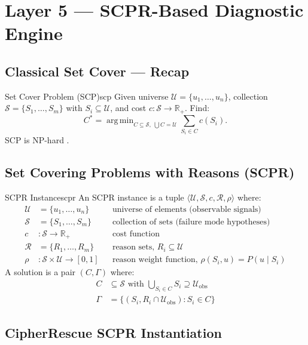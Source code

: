 \documentclass[11pt,a4paper]{report}
\DeclareMathOperator*{\argmin}{arg\,min}
\newcommand{\calU}{\mathcal{U}}
\newcommand{\calS}{\mathcal{S}}
\newcommand{\calR}{\mathcal{R}}
\begin{document}
\chapter{Layer 5 --- SCPR-Based Diagnostic Engine}

\section{Classical Set Cover --- Recap}

\begin{definition}{Set Cover Problem (SCP)}{scp}
Given universe $\calU = \{u_1,\ldots,u_n\}$, collection $\calS = \{S_1,\ldots,S_m\}$ with $S_i \subseteq \calU$, and cost $c : \calS \to \mathbb{R}_+$. Find:
\[
  C^* = \argmin_{C \subseteq \calS,\; \bigcup C = \calU} \sum_{S_i \in C} c(S_i).
\]
SCP is NP-hard \citep{karp1972}.
\end{definition}

\section{Set Covering Problems with Reasons (SCPR)}\label{sec:scpr}

\begin{definition}{SCPR Instance}{scpr}
An SCPR instance is a tuple $\langle \calU, \calS, c, \calR, \rho \rangle$ where:
\begin{align*}
  \calU &= \{u_1,\ldots,u_n\} && \text{universe of elements (observable signals)} \\
  \calS &= \{S_1,\ldots,S_m\} && \text{collection of sets (failure mode hypotheses)} \\
  c &: \calS \to \mathbb{R}_+ && \text{cost function} \\
  \calR &= \{R_1,\ldots,R_m\} && \text{reason sets, } R_i \subseteq \calU \\
  \rho &: \calS \times \calU \to [0,1] && \text{reason weight function, } \rho(S_i, u) = P(u \mid S_i)
\end{align*}
A solution is a pair $(C, \Gamma)$ where:
\begin{align*}
  C &\subseteq \calS \text{ with } \bigcup_{S_i \in C} S_i \supseteq \calU_{\mathrm{obs}} \\
  \Gamma &= \{(S_i, R_i \cap \calU_{\mathrm{obs}}) : S_i \in C\}
\end{align*}
\end{definition}

\section{CipherRescue SCPR Instantiation}
\end{document}
